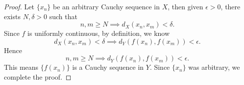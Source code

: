 \begin{Exercise}
\begin{proof}
Let $\{x_n\}$ be an arbitrary Cauchy sequence in $X$, then given $\epsilon>0$, there exists $N,\delta>0$ such that
$$
n,m\geq N \implies d_X(x_n,x_m)<\delta.
$$
Since $f$ is uniformly continuous, by definition, we know
$$
d_X(x_n,x_m) <\delta \implies d_Y(f(x_n),f(x_m)) < \epsilon.
$$
Hence
$$
n,m\geq N \implies d_Y(f(x_n),f(x_m))<\epsilon.
$$
This means $\{f(x_n)\}$ is a Cauchy sequence in $Y$. Since $\{x_n\}$ was arbitrary, we complete the proof.
\end{proof}
\end{Exercise}